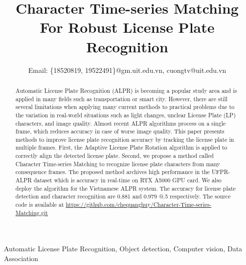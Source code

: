 \documentclass[conference]{IEEEtran}
\begin{document}
\title{Character Time-series Matching For Robust License Plate Recognition\\
}
\author{


Email: \{18520819, 19522491\}@gm.uit.edu.vn, cuongtv@uit.edu.vn
}



\maketitle



\begin{abstract}
Automatic License Plate Recognition (ALPR) is becoming a popular study area and is applied in many fields such as transportation or smart city. However, there are still several limitations when applying many current methods to practical problems due to the variation in real-world situations such as light changes, unclear License Plate (LP) characters, and image quality. Almost recent ALPR algorithms process on a single frame, which reduces accuracy in case of worse image quality. This paper presents methods to improve license plate recognition accuracy by tracking the license plate in multiple frames. First, the Adaptive License Plate Rotation algorithm is applied to correctly align the detected license plate. Second, we propose a method called Character Time-series Matching to recognize license plate characters from many consequence frames. The proposed method archives high performance in the UFPR-ALPR dataset which is \boldmath accuracy in real-time on RTX A5000 GPU card. We also deploy the algorithm for the Vietnamese ALPR system. The accuracy for license plate detection and character recognition are 0.881 and 0.979 @.5 respectively. The source code is available at \url{https://github.com/chequanghuy/Character-Time-series-Matching.git}

\end{abstract}

\begin{IEEEkeywords}
Automatic License Plate Recognition, Object detection, Computer vision, Data Association
\end{IEEEkeywords}
\end{document}
